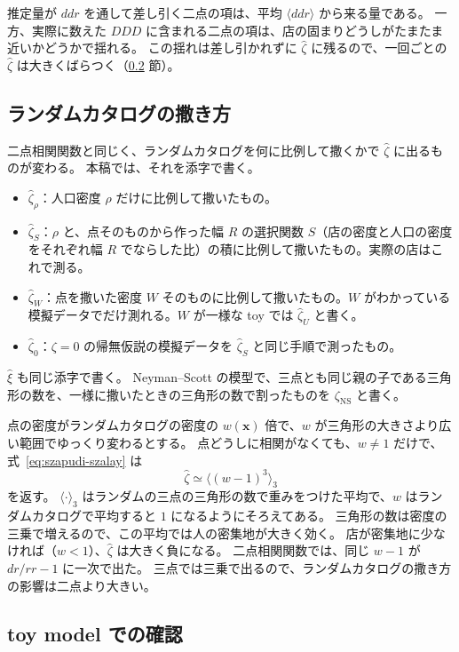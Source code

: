 \documentclass[a4paper,11pt]{ltjsarticle}
\begin{document}
推定量が $ddr$ を通して差し引く二点の項は、平均 $\langle ddr \rangle$ から来る量である。
一方、実際に数えた $DDD$ に含まれる二点の項は、店の固まりどうしがたまたま近いかどうかで揺れる。
この揺れは差し引かれずに $\hat\zeta$ に残るので、一回ごとの $\hat\zeta$ は大きくばらつく（\ref{sec:toy} 節）。

\subsection{ランダムカタログの撒き方}
\label{sec:baseline}

二点相関関数と同じく、ランダムカタログを何に比例して撒くかで $\hat\zeta$ に出るものが変わる。
本稿では、それを添字で書く。
\begin{itemize}
  \item $\hat\zeta_\rho$：人口密度 $\rho$ だけに比例して撒いたもの。
  \item $\hat\zeta_S$：$\rho$ と、点そのものから作った幅 $R$ の選択関数 $S$（店の密度と人口の密度をそれぞれ幅 $R$ でならした比）の積に比例して撒いたもの。実際の店はこれで測る。
  \item $\hat\zeta_W$：点を撒いた密度 $W$ そのものに比例して撒いたもの。$W$ がわかっている模擬データでだけ測れる。$W$ が一様な toy では $\hat\zeta_U$ と書く。
  \item $\hat\zeta_0$：$\zeta = 0$ の帰無仮説の模擬データを $\hat\zeta_S$ と同じ手順で測ったもの。
\end{itemize}
$\hat\xi$ も同じ添字で書く。
Neyman--Scott の模型で、三点とも同じ親の子である三角形の数を、一様に撒いたときの三角形の数で割ったものを $\zeta_{\mathrm{NS}}$ と書く。

点の密度がランダムカタログの密度の $w(\bm{x})$ 倍で、$w$ が三角形の大きさより広い範囲でゆっくり変わるとする。
点どうしに相関がなくても、$w \ne 1$ だけで、式~\eqref{eq:szapudi-szalay} は
\begin{equation}
  \hat\zeta \simeq \langle (w - 1)^3 \rangle_3
  \label{eq:zeta-mismatch}
\end{equation}
を返す。
$\langle\cdot\rangle_3$ はランダムの三点の三角形の数で重みをつけた平均で、$w$ はランダムカタログで平均すると $1$ になるようにそろえてある。
三角形の数は密度の三乗で増えるので、この平均では人の密集地が大きく効く。
店が密集地に少なければ（$w < 1$）、$\hat\zeta$ は大きく負になる。
二点相関関数では、同じ $w - 1$ が $dr/rr - 1$ に一次で出た。
三点では三乗で出るので、ランダムカタログの撒き方の影響は二点より大きい。

\subsection{toy model での確認}
\label{sec:toy}
\end{document}
